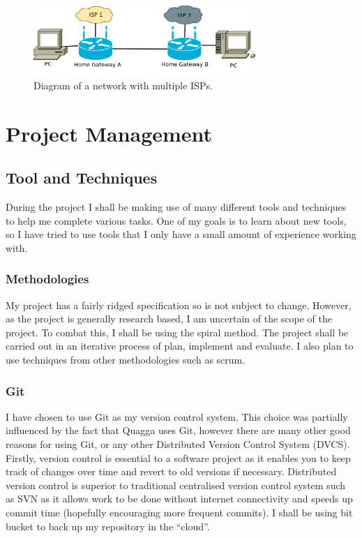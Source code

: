 \documentclass[12pt]{report}
\begin{document}
\begin{figure}
\centering
\includegraphics[width=0.75\textwidth]{../Diagrams/Network/MultipleISP.png}
\caption{Diagram of a network with multiple ISPs.}
\label{fig:ComplexTestNet}
\end{figure}

\chapter{Project Management}

\section{Tool and Techniques}

During the project I shall be making use of many different tools and techniques
to help me complete various tasks. One of my goals is to learn about new tools,
so I have tried to use tools that I only have a small amount of experience
working with. 

\subsection{Methodologies}
My project has a fairly ridged specification so is not subject to change.
However, as the project is generally research based, I am uncertain of the scope
of the project. To combat this, I shall be using the spiral method. The project
shall be carried out in an iterative process of plan, implement and evaluate. I
also plan to use techniques from other methodologies such as scrum. 

\subsection{Git}
I have chosen to use Git as my version control system. This choice was
partially influenced by the fact that Quagga uses Git, however there are many
other good reasons for using Git, or any other Distributed Version Control
System (DVCS). Firstly, version control is essential to a software project as
it enables you to keep track of changes over time and revert to old versions if
necessary. Distributed version control is superior to traditional centralised 
version control system such as SVN as it allows work to be done without internet
connectivity and speeds up commit time (hopefully encouraging more frequent
commits). I shall be using bit bucket to back up my repository in the ``cloud''.
\end{document}
